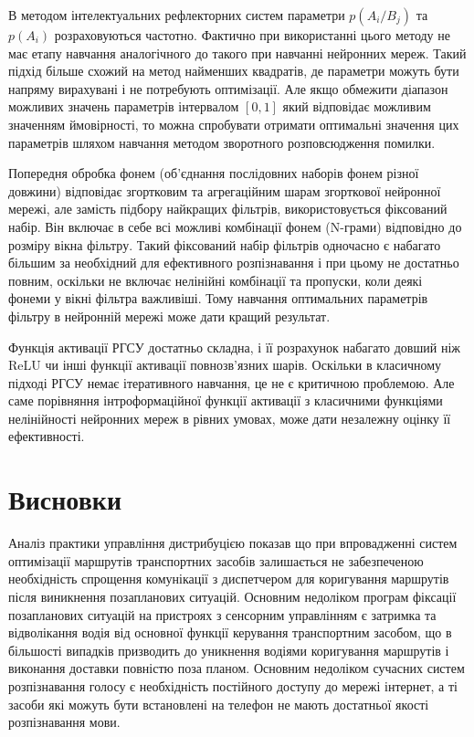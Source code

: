 В методом інтелектуальних рефлекторних систем параметри $p(A_i/B_j)$ та $p(A_i)$ розраховуються частотно. Фактично при використанні цього методу не має етапу навчання аналогічного до такого при навчанні нейронних мереж. Такий підхід більше схожий на метод найменших квадратів, де параметри можуть бути напряму вирахувані і не потребують оптимізації.
Але якщо обмежити діапазон можливих значень параметрів інтервалом $[0, 1]$ який відповідає можливим значенням ймовірності, то можна спробувати отримати оптимальні значення цих параметрів шляхом навчання методом зворотного розповсюдження помилки.

Попередня обробка фонем (об'єднання послідовних наборів фонем різної довжини) відповідає згортковим та агрегаційним шарам згорткової нейронної мережі, але замість підбору найкращих фільтрів, використовується фіксований набір. Він включає в себе всі можливі комбінації фонем (N-грами) відповідно до розміру вікна фільтру. Такий фіксований набір фільтрів одночасно є набагато більшим за необхідний для ефективного розпізнавання і при цьому не достатньо повним, оскільки не включає нелінійні комбінації та пропуски, коли деякі фонеми у вікні фільтра важливіші. Тому навчання оптимальних параметрів фільтру в нейронній мережі може дати кращий результат.

Функція активації РГСУ достатньо складна, і її розрахунок набагато довший ніж ReLU чи інші функції активації  повнозв'язних шарів. Оскільки в класичному підході РГСУ немає ітеративного навчання, це не є критичною проблемою. Але саме порівняння інтроформаційної функції активації з класичними функціями нелінійності нейронних мереж в рівних умовах, може дати незалежну оцінку її ефективності.


\section{Висновки}

Аналіз практики управління дистрибуцією показав що при впровадженні систем оптимізації маршрутів транспортних засобів залишається не забезпеченою необхідність спрощення комунікації з диспетчером для коригування маршрутів після виникнення позапланових ситуацій. Основним недоліком програм фіксації позапланових ситуацій на пристроях з сенсорним управлінням є затримка та відволікання водія від основної функції керування транспортним засобом, що в більшості випадків призводить до уникнення водіями коригування маршрутів і виконання доставки повністю поза планом. Основним недоліком сучасних систем розпізнавання голосу є необхідність постійного доступу до мережі інтернет, а ті засоби які можуть бути встановлені на телефон не мають достатньої якості розпізнавання мови.

